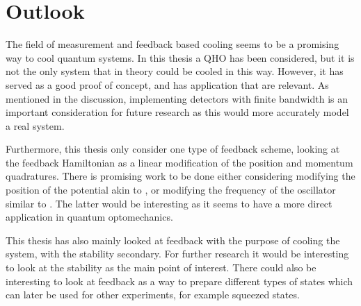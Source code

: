 \section{Outlook}
The field of measurement and feedback based cooling seems to be a promising way to cool quantum systems. In this thesis a QHO has been considered, but it is not the only system that in theory could be cooled in this way. However, it has served as a good proof of concept, and has application that are relevant. As mentioned in the discussion, implementing detectors with finite bandwidth is an important consideration for future research as this would more accurately model a real system. 

Furthermore, this thesis only consider one type of feedback scheme, looking at the feedback Hamiltonian as a linear modification of the position and momentum quadratures. There is promising work to be done either considering modifying the position of the potential akin to \cite{De-Sousa:2025}, or modifying the frequency of the oscillator similar to \cite{Habibi:2016}. The latter would be interesting as it seems to have a more direct application in quantum optomechanics.

This thesis has also mainly looked at feedback with the purpose of cooling the system, with the stability secondary. For further research it would be interesting to look at the stability as the main point of interest. There could also be interesting to look at feedback as a way to prepare different types of states which can later be used for other experiments, for example squeezed states.